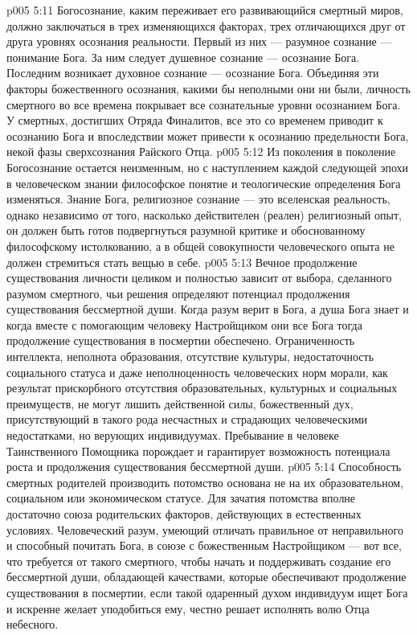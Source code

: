\vs p005 5:11 \pc Богосознание, каким переживает его развивающийся смертный миров, должно заключаться в трех изменяющихся факторах, трех отличающихся друг от друга уровнях осознания реальности. Первый из них --- разумное сознание --- понимание  Бога. За ним следует душевное сознание --- осознание  Бога. Последним возникает духовное сознание --- осознание  Бога. Объединяя эти факторы божественного осознания, какими бы неполными они ни были, личность смертного во все времена покрывает все сознательные уровни осознанием  Бога. У смертных, достигших Отряда Финалитов, все это со временем приводит к осознанию  Бога и впоследствии может привести к осознанию предельности Бога, некой фазы  сверхсознания Райского Отца.
\vs p005 5:12 Из поколения в поколение Богосознание остается неизменным, но с наступлением каждой следующей эпохи в человеческом знании философское понятие и теологические определения Бога  изменяться. Знание Бога, религиозное сознание --- это вселенская реальность, однако независимо от того, насколько действителен (реален) религиозный опыт, он должен быть готов подвергнуться разумной критике и обоснованному философскому истолкованию, а в общей совокупности человеческого опыта не должен стремиться стать вещью в себе.
\vs p005 5:13 \pc Вечное продолжение существования личности целиком и полностью зависит от выбора, сделанного разумом смертного, чьи решения определяют потенциал продолжения существования бессмертной души. Когда разум верит в Бога, а душа Бога знает и когда вместе с помогающим человеку Настройщиком они все Бога  тогда продолжение существования в посмертии обеспечено. Ограниченность интеллекта, неполнота образования, отсутствие культуры, недостаточность социального статуса и даже неполноценность человеческих норм морали, как результат прискорбного отсутствия образовательных, культурных и социальных преимуществ, не могут лишить действенной силы, божественный дух, присутствующий в такого рода несчастных и страдающих человеческими недостатками, но верующих индивидуумах. Пребывание в человеке Таинственного Помощника порождает и гарантирует возможность потенциала роста и продолжения существования бессмертной души.
\vs p005 5:14 Способность смертных родителей производить потомство основана не на их образовательном, социальном или экономическом статусе. Для зачатия потомства вполне достаточно союза родительских факторов, действующих в естественных условиях. Человеческий разум, умеющий отличать правильное от неправильного и способный почитать Бога, в союзе с божественным Настройщиком --- вот все, что требуется от такого смертного, чтобы начать и поддерживать создание его бессмертной души, обладающей качествами, которые обеспечивают продолжение существования в посмертии, если такой одаренный духом индивидуум ищет Бога и искренне желает уподобиться ему, честно решает исполнять волю Отца небесного.
